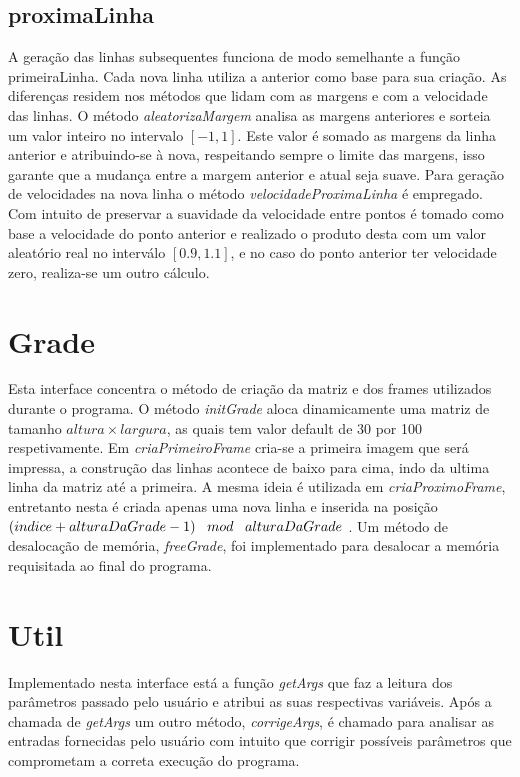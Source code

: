 \documentclass[a4paper,11pt]{article}
\begin{document}
\subsection{proximaLinha}

A gera\c{c}ão das linhas subsequentes funciona de modo semelhante a fun\c{c}ão primeiraLinha. Cada nova linha utiliza a anterior como base para sua cria\c{c}ão. As diferen\c{c}as residem nos métodos que lidam com as margens e com a velocidade das linhas. O método \textit{aleatorizaMargem} analisa as margens anteriores e sorteia um valor inteiro no intervalo $[-1,1]$. Este valor é somado as margens da linha anterior e atribuindo-se à nova, respeitando sempre o limite das margens, isso garante que a mudan\c{c}a entre a margem anterior e atual seja suave. Para gera\c{c}ão de velocidades na nova linha o método \textit{velocidadeProximaLinha} é empregado. Com intuito de preservar a suavidade da velocidade entre pontos é tomado como base a velocidade do ponto anterior e realizado o produto desta com um valor aleatório real no interválo $[0.9,1.1]$, e no caso do ponto anterior ter velocidade zero, realiza-se um outro cálculo.

\section{Grade}
Esta interface concentra o método de cria\c{c}ão da matriz e dos frames utilizados durante o programa. O método \textit{initGrade} aloca dinamicamente uma matriz de tamanho $altura \times largura$, as quais tem valor default de 30 por 100 respetivamente. Em \textit{criaPrimeiroFrame} cria-se a primeira imagem que será impressa, a constru\c{c}ão das linhas acontece de baixo para cima, indo da ultima linha da matriz até a primeira. A mesma ideia é utilizada em \textit{criaProximoFrame}, entretanto nesta é criada apenas uma nova linha e inserida na posi\c{c}ão $(indice + alturaDaGrade -1)\text{ \, } mod \text{ \, } alturaDaGrade$ . Um método de desaloca\c{c}ão de memória, \textit{freeGrade}, foi implementado para desalocar a memória requisitada ao final do programa.


\section{Util}
Implementado nesta interface está a fun\c{c}ão \textit{getArgs} que faz a leitura dos parâmetros passado pelo usuário e atribui as suas respectivas variáveis. Após a chamada de \textit{getArgs} um outro método, 
\textit{corrigeArgs}, é chamado para analisar as entradas fornecidas pelo usuário com intuito que corrigir possíveis parâmetros que comprometam a correta execu\c{c}ão do programa.
\end{document}
